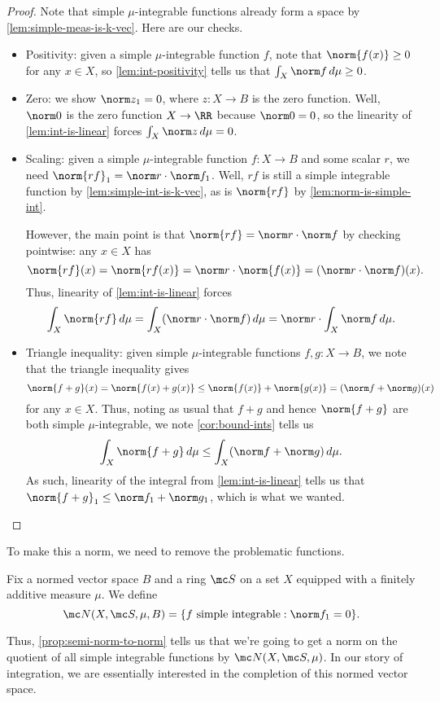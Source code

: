 \documentclass[../notes.tex]{subfiles}
\begin{document}
\begin{proof}
	Note that simple $\mu$-integrable functions already form a space by \autoref{lem:simple-meas-is-k-vec}. Here are our checks.
	\begin{itemize}
		\item Positivity: given a simple $\mu$-integrable function $f$, note that $\norm{f(x)}\ge0$ for any $x\in X$, so \autoref{lem:int-positivity} tells us that $\int_X\norm f\,d\mu\ge0$.
		\item Zero: we show $\norm z_1=0$, where $z\colon X\to B$ is the zero function. Well, $\norm0$ is the zero function $X\to\RR$ because $\norm0=0$, so the linearity of \autoref{lem:int-is-linear} forces $\int_X\norm z\,d\mu=0$.
		\item Scaling: given a simple $\mu$-integrable function $f\colon X\to B$ and some scalar $r$, we need $\norm{rf}_1=\norm r\cdot\norm f_1$. Well, $rf$ is still a simple integrable function by \autoref{lem:simple-int-is-k-vec}, as is $\norm{rf}$ by \autoref{lem:norm-is-simple-int}.

		However, the main point is that $\norm{rf}=\norm r\cdot\norm f$ by checking pointwise: any $x\in X$ has
		\[\norm{rf}(x)=\norm{rf(x)}=\norm r\cdot\norm{f(x)}=(\norm r\cdot\norm f)(x).\]
		Thus, linearity of \autoref{lem:int-is-linear} forces
		\[\int_X\norm{rf}\,d\mu=\int_X(\norm r\cdot\norm f)\,d\mu=\norm r\cdot\int_X\norm f\,d\mu.\]
		\item Triangle inequality: given simple $\mu$-integrable functions $f,g\colon X\to B$, we note that the triangle inequality gives
		\[\norm{f+g}(x)=\norm{f(x)+g(x)}\le\norm{f(x)}+\norm{g(x)}=(\norm f+\norm g)(x)\]
		for any $x\in X$. Thus, noting as usual that $f+g$ and hence $\norm{f+g}$ are both simple $\mu$-integrable, we note \autoref{cor:bound-ints} tells us
		\[\int_X\norm{f+g}\,d\mu\le\int_X(\norm f+\norm g)\,d\mu.\]
		As such, linearity of the integral from \autoref{lem:int-is-linear} tells us that $\norm{f+g}_1\le\norm f_1+\norm g_1$, which is what we wanted.
		\qedhere
	\end{itemize}
\end{proof}
To make this a norm, we need to remove the problematic functions.
\begin{notation}
	Fix a normed vector space $B$ and a ring $\mc S$ on a set $X$ equipped with a finitely additive measure $\mu$. We define
	\[\mc N(X,\mc S,\mu,B)=\{f\text{ simple integrable}:\norm f_1=0\}.\]
\end{notation}
Thus, \autoref{prop:semi-norm-to-norm} tells us that we're going to get a norm on the quotient of all simple integrable functions by $\mc N(X,\mc S,\mu)$. In our story of integration, we are essentially interested in the completion of this normed vector space.
\end{document}
